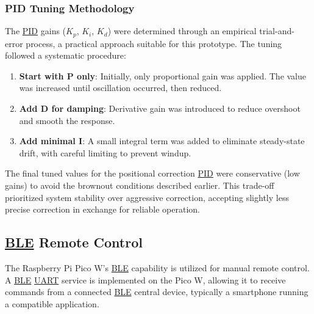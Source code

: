 \subsubsection{PID Tuning Methodology}
\label{subsubsec:pid_tuning}
The \hyperref[term:pid]{PID} gains ($K_p$, $K_i$, $K_d$) were determined through an empirical trial-and-error process, a practical approach suitable for this prototype. The tuning followed a systematic procedure:
\begin{enumerate}
    \item \textbf{Start with P only}: Initially, only proportional gain was applied. The value was increased until oscillation occurred, then reduced.
    \item \textbf{Add D for damping}: Derivative gain was introduced to reduce overshoot and smooth the response.
    \item \textbf{Add minimal I}: A small integral term was added to eliminate steady-state drift, with careful limiting to prevent windup.
\end{enumerate}
The final tuned values for the positional correction \hyperref[term:pid]{PID} were conservative (low gains) to avoid the brownout conditions described earlier. This trade-off prioritized system stability over aggressive correction, accepting slightly less precise correction in exchange for reliable operation.

\subsection{\texorpdfstring{\hyperref[term:ble]{BLE}}{BLE} Remote Control}
\label{subsec:ble_remote_control_ctrl_new} %
The Raspberry Pi Pico W's \hyperref[term:ble]{BLE} capability is utilized for manual remote control. A \hyperref[term:ble]{BLE} \hyperref[term:uart]{UART} service is implemented on the Pico W, allowing it to receive commands from a connected \hyperref[term:ble]{BLE} central device, typically a smartphone running a compatible application.
